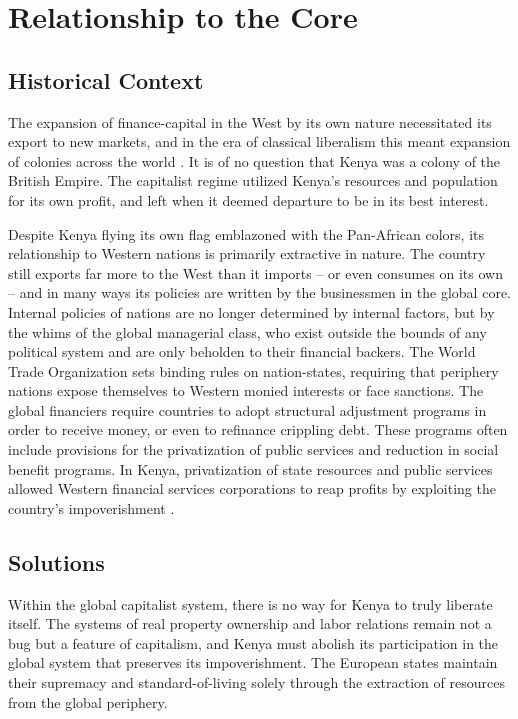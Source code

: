 \documentclass[american]{../../../coursework}
\begin{document}
\section{Relationship to the Core}
\subsection{Historical Context}

The expansion of finance-capital in the West by its own nature necessitated
its export to new markets, and in the era of classical liberalism this meant
expansion of colonies across the world \parencite{Lenin1917}. It is of no
question that Kenya was a colony of the British Empire. The capitalist regime
utilized Kenya's resources and population for its own profit, and left when it
deemed departure to be in its best interest.

Despite Kenya flying its own flag emblazoned with the Pan-African colors, its
relationship to Western nations is primarily extractive in nature. The country
still exports far more to the West than it imports -- or even consumes on its
own -- and in many ways its policies are written by the businessmen in the
global core. Internal policies of nations are no longer determined by internal
factors, but by the whims of the global managerial class, who exist outside
the bounds of any political system and are only beholden to their financial
backers. The World Trade Organization sets binding rules on nation-states,
requiring that periphery nations expose themselves to Western monied interests
or face sanctions. The global financiers require countries to adopt structural
adjustment programs in order to receive money, or even to refinance crippling
debt. These programs often include provisions for the privatization of public
services and reduction in social benefit programs. In Kenya, privatization of
state resources and public services allowed Western financial services
corporations to reap profits by exploiting the country's impoverishment
\parencite{McMichael2004}.


\subsection{Solutions}

Within the global capitalist system, there is no way for Kenya to truly
liberate itself. The systems of real property ownership and labor relations
remain not a bug but a feature of capitalism, and Kenya must abolish its
participation in the global system that preserves its impoverishment. The
European states maintain their supremacy and standard-of-living solely through
the extraction of resources from the global periphery.
\end{document}
